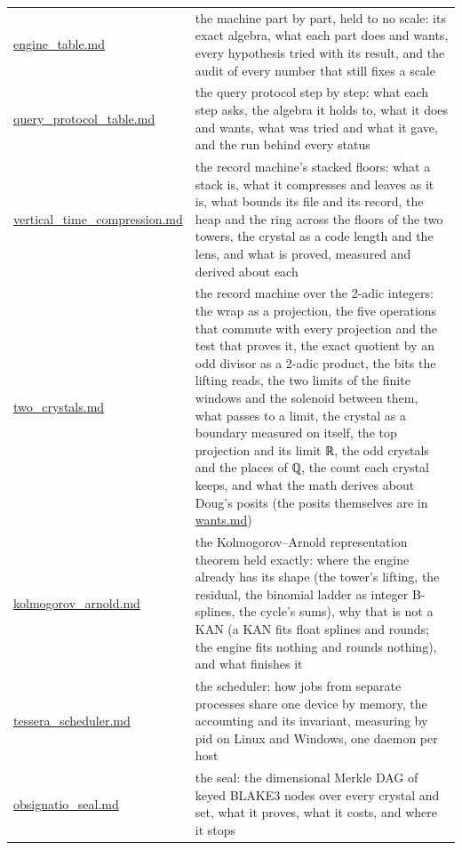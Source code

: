{\begin{longtable}{>{\RaggedRight\arraybackslash}p{}>{\RaggedRight\arraybackslash}p{}}
\hyperref[chap:engine-table]{engine\_\allowbreak{}table.md} & the machine part by part, held to no scale: its exact algebra, what each part does and wants, every hypothesis tried with its result, and the audit of every number that still fixes a scale \\
\hyperref[chap:query-protocol-table]{query\_\allowbreak{}protocol\_\allowbreak{}table.md} & the query protocol step by step: what each step asks, the algebra it holds to, what it does and wants, what was tried and what it gave, and the run behind every status \\
\hyperref[chap:vertical-time-compression]{vertical\_\allowbreak{}time\_\allowbreak{}compression.md} & the record machine's stacked floors: what a stack is, what it compresses and leaves as it is, what bounds its file and its record, the heap and the ring across the floors of the two towers, the crystal as a code length and the lens, and what is proved, measured and derived about each \\
\hyperref[chap:two-crystals]{two\_\allowbreak{}crystals.md} & the record machine over the 2-adic integers: the wrap as a projection, the five operations that commute with every projection and the test that proves it, the exact quotient by an odd divisor as a 2-adic product, the bits the lifting reads, the two limits of the finite windows and the solenoid between them, what passes to a limit, the crystal as a boundary measured on itself, the top projection and its limit ℝ, the odd crystals and the places of ℚ, the count each crystal keeps, and what the math derives about Doug's posits (the posits themselves are in \hyperref[chap:wants]{wants.md}) \\
\hyperref[chap:kolmogorov-arnold]{kolmogorov\_\allowbreak{}arnold.md} & the Kolmogorov–Arnold representation theorem held exactly: where the engine already has its shape (the tower's lifting, the residual, the binomial ladder as integer B-splines, the cycle's sums), why that is not a KAN (a KAN fits float splines and rounds; the engine fits nothing and rounds nothing), and what finishes it \\
\hyperref[chap:tessera-scheduler]{tessera\_\allowbreak{}scheduler.md} & the scheduler: how jobs from separate processes share one device by memory, the accounting and its invariant, measuring by pid on Linux and Windows, one daemon per host \\
\hyperref[chap:obsignatio-seal]{obsignatio\_\allowbreak{}seal.md} & the seal: the dimensional Merkle DAG of keyed BLAKE3 nodes over every crystal and set, what it proves, what it costs, and where it stops \\

\end{longtable}}
